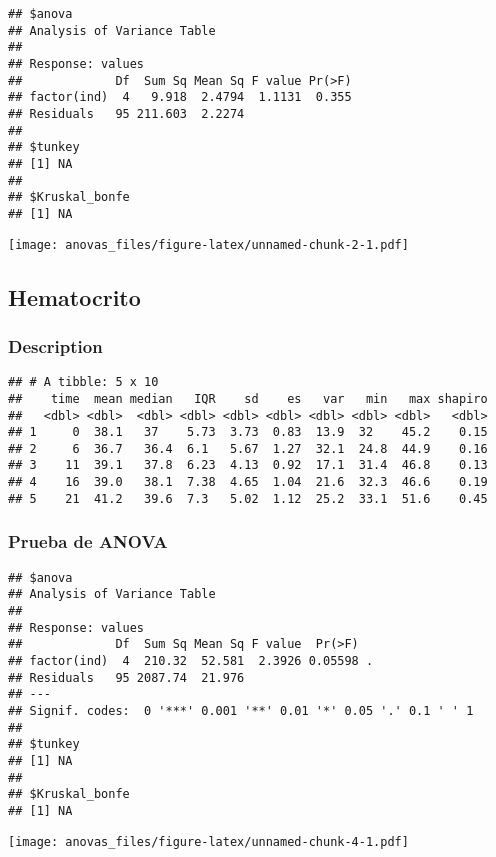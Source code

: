\documentclass[
]{article}
\begin{document}
\begin{verbatim}
## $anova
## Analysis of Variance Table
## 
## Response: values
##             Df  Sum Sq Mean Sq F value Pr(>F)
## factor(ind)  4   9.918  2.4794  1.1131  0.355
## Residuals   95 211.603  2.2274               
## 
## $tunkey
## [1] NA
## 
## $Kruskal_bonfe
## [1] NA
\end{verbatim}

\texttt{[image: anovas\_files/figure-latex/unnamed-chunk-2-1.pdf]}

\hypertarget{hematocrito}{%
\subsection{Hematocrito}\label{hematocrito}}

\hypertarget{description-1}{%
\subsubsection{Description}\label{description-1}}

\begin{verbatim}
## # A tibble: 5 x 10
##    time  mean median   IQR    sd    es   var   min   max shapiro
##   <dbl> <dbl>  <dbl> <dbl> <dbl> <dbl> <dbl> <dbl> <dbl>   <dbl>
## 1     0  38.1   37    5.73  3.73  0.83  13.9  32    45.2    0.15
## 2     6  36.7   36.4  6.1   5.67  1.27  32.1  24.8  44.9    0.16
## 3    11  39.1   37.8  6.23  4.13  0.92  17.1  31.4  46.8    0.13
## 4    16  39.0   38.1  7.38  4.65  1.04  21.6  32.3  46.6    0.19
## 5    21  41.2   39.6  7.3   5.02  1.12  25.2  33.1  51.6    0.45
\end{verbatim}

\hypertarget{prueba-de-anova-1}{%
\subsubsection{Prueba de ANOVA}\label{prueba-de-anova-1}}

\begin{verbatim}
## $anova
## Analysis of Variance Table
## 
## Response: values
##             Df  Sum Sq Mean Sq F value  Pr(>F)  
## factor(ind)  4  210.32  52.581  2.3926 0.05598 .
## Residuals   95 2087.74  21.976                  
## ---
## Signif. codes:  0 '***' 0.001 '**' 0.01 '*' 0.05 '.' 0.1 ' ' 1
## 
## $tunkey
## [1] NA
## 
## $Kruskal_bonfe
## [1] NA
\end{verbatim}

\texttt{[image: anovas\_files/figure-latex/unnamed-chunk-4-1.pdf]}
\end{document}
